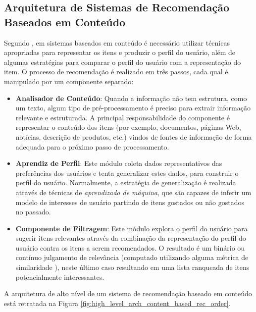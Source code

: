 \subsection{Arquitetura de Sistemas de Recomendação Baseados em Conteúdo}
\label{subsec:cb-recsys-architecture}

Segundo \cite{Lops2011}, em sistemas baseados em conteúdo é necessário utilizar técnicas apropriadas para representar os itens e produzir o perfil do usuário, além de algumas estratégias para comparar o perfil do usuário com a representação do item. O processo de recomendação é realizado em três passos, cada qual é manipulado por um componente separado:

\begin{itemize}
	\item{\textbf{Analisador de Conteúdo}: Quando a informação não tem estrutura, como um texto, algum tipo de pré-processamento é preciso para extrair informação relevante e estruturada. A principal responsabilidade do componente é representar o conteúdo dos itens (por exemplo, documentos, páginas Web, notícias, descrição de produtos, etc.) vindos de fontes de informação de forma adequada para o próximo passo de processamento.}
	
	\item{\textbf{Aprendiz de Perfil}: Este módulo coleta dados representativos das preferências dos usuários e tenta generalizar estes dados, para construir o perfil do usuário. Normalmente, a estratégia de generalização é realizada através de técnicas de \textit{aprendizado de máquina}, que são capazes de inferir um modelo de interesses de usuário partindo de itens gostados ou não gostados no passado.}
	
	\item{\textbf{Componente de Filtragem}: Este módulo explora o perfil do usuário para sugerir itens relevantes através da combinação da representação do perfil do usuário contra os itens a serem recomendados. O resultado é um binário ou contínuo julgamento de relevância (computado utilizando alguma métrica de similaridade \citep{Herlocker:2004:ECF:963770.963772}), neste último caso resultando em uma lista ranqueada de itens potencialmente interessantes.}
\end{itemize}

A arquitetura de alto nível de um sistema de recomendação baseado em conteúdo está retratada na Figura \ref{fig:high_level_arch_content_based_rec_order}.


